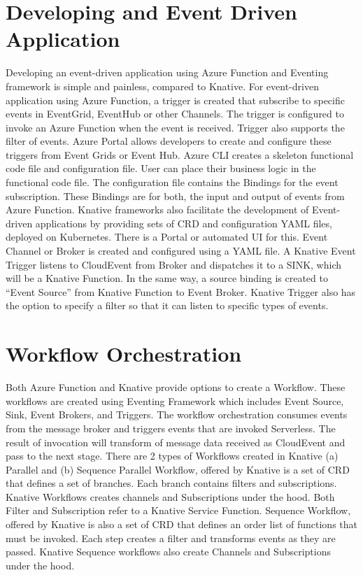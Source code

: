 \documentclass[12pt]{article}
\begin{document}
\begin{flushleft}
\section{Developing and Event Driven Application}
Developing an event-driven application using Azure Function and Eventing framework is simple and painless, compared to Knative.
For event-driven application using Azure Function, a trigger is created that subscribe to specific events in EventGrid, EventHub or other Channels. The trigger is configured to invoke an Azure Function when the event is received. Trigger also supports the filter of events. 
Azure Portal allows developers to create and configure these triggers from Event Grids or Event Hub.
Azure CLI creates a skeleton functional code file and configuration file. User can place their business logic in the functional code file. The configuration file contains the Bindings for the event subscription. These Bindings are for both, the input and output of events from Azure Function. 
Knative frameworks also facilitate the development of Event-driven applications by providing sets of CRD and configuration YAML files, deployed on Kubernetes. There is a Portal or automated UI for this. Event Channel or Broker is created and configured using a YAML file. 
A Knative Event Trigger listens to CloudEvent from Broker and dispatches it to a SINK, which will be a Knative Function. In the same way, a source binding is created to “Event Source” from Knative Function to Event Broker. Knative Trigger also has the option to specify a filter so that it can listen to specific types of events.


\section{Workflow Orchestration }
Both Azure Function and Knative provide options to create a Workflow. These workflows are created using Eventing Framework which includes Event Source, Sink, Event Brokers, and Triggers. 
The workflow orchestration consumes events from the message broker and triggers events that are invoked Serverless. The result of invocation will transform of message data received as CloudEvent and pass to the next stage. 
There are 2 types of Workflows created in Knative (a) Parallel and (b) Sequence 
Parallel Workflow, offered by Knative is a set of CRD that defines a set of branches. Each branch contains filters and subscriptions. Knative Workflows creates channels and Subscriptions under the hood. Both Filter and Subscription refer to a Knative Service Function.
Sequence Workflow, offered by Knative is also a set of CRD that defines an order list of functions that must be invoked. Each step creates a filter and transforms events as they are passed. Knative Sequence workflows also create Channels and Subscriptions under the hood.


\end{flushleft}
\end{document}
